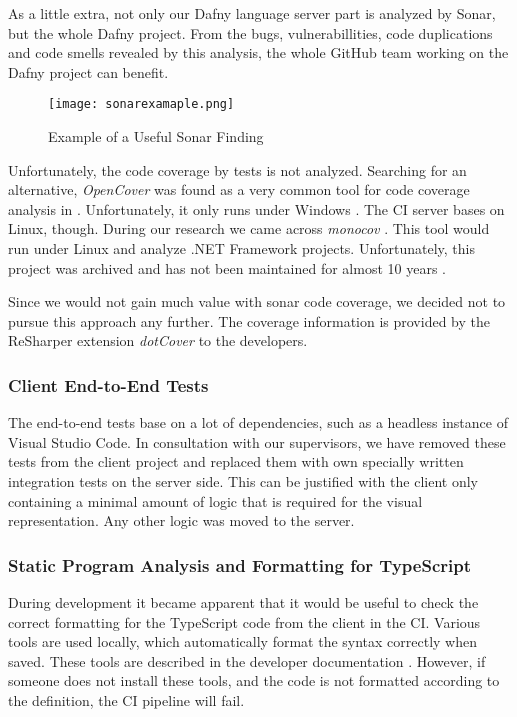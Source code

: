 As a little extra, not only our Dafny language server part is analyzed by Sonar,
but the whole Dafny project.
From the bugs, vulnerabillities, code duplications and code smells revealed
by this analysis, the whole GitHub team working on the Dafny project can benefit. \\

\begin{figure}[H]
    \centering
    \texttt{[image: sonarexamaple.png]}
    \caption{Example of a Useful Sonar Finding}
    \label{fig:sonarexample}
\end{figure}


Unfortunately, the code coverage by tests is not analyzed.
Searching for an alternative, \textit{OpenCover} was found as a very common tool for code coverage analysis in \Csharp.
Unfortunately, it only runs under Windows  \cite{opencover}.
The CI server bases on Linux, though.
During our research we came across \textit{monocov} \cite{monocov}.
This tool would run under Linux and analyze .NET Framework projects.
Unfortunately, this project was archived and has not been maintained for almost 10 years \cite{monocov}.

Since we would not gain much value with sonar code coverage, we decided not to pursue this approach any further.
The coverage information is provided by the ReSharper extension \textit{dotCover} \cite{dotcover} to the developers.

\subsubsection{Client End-to-End Tests}
The end-to-end tests base on a lot of dependencies, such as a headless instance of Visual Studio Code.
In consultation with our supervisors, we have removed these tests from the client project and replaced them with own specially written integration tests on the server side.
This can be justified with the client only containing a minimal amount of logic that is required for the visual representation.
Any other logic was moved to the server.

\subsubsection{Static Program Analysis and Formatting for TypeScript}
During development it became apparent that it would be useful to check the correct formatting
for the TypeScript code from the client in the CI.
Various tools are used locally, which automatically format the syntax correctly when saved.
These tools are described in the developer documentation \cite{dev}.
However, if someone does not install these tools,
and the code is not formatted according to the definition,
the CI pipeline will fail. \\

